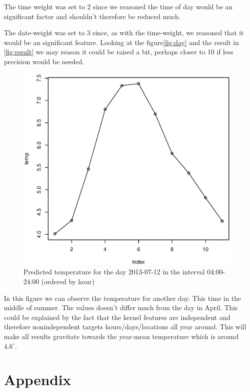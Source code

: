 \documentclass[a4paper, 12pt]{article}
\begin{document}
    The time weight was set to 2 since we reasoned the time of day would be an significant factor and shouldn't therefore be reduced much. 

    The date-weight was set to 3 since, as with the time-weight, we reasoned that it would be an significant feature. Looking at the figure\ref{fig:day} and the result in \ref{fig:result} we may reason it could be raised a bit, perhaps closer to 10 if less precision would be needed.

    \begin{figure}[H]
    \centering
    \caption{Predicted temperature for the day 2013-07-12 in the interval 04:00-24:00 (ordered by hour)\label{fig:bad_result}}
        \begin{minipage}[]{0.4\textwidth}
            \includegraphics[width=\textwidth]{share/bad_result.eps}
        \end{minipage}
    \end{figure}
    In this figure we can observe the temperature for another day. This time in the middle of summer. The values doesn't differ much from the day in April. This could be explained by the fact that the kernel features are independent and therefore nonindependent targets hours/days/locations all year around. This will make all results gravitate towards the year-mean temperature which is around \(4.6^\circ\). 

    \nocite{*} %
    
    
    \onecolumn \appendix
    \section*{Appendix}
    


    
\end{document}
